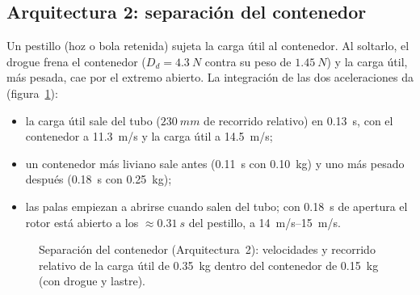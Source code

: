\subsection{Arquitectura 2: separación del contenedor}
Un pestillo (hoz o bola retenida) sujeta la carga útil al contenedor. Al soltarlo, el drogue
frena el contenedor ($D_d=\SI{4.3}{N}$ contra su peso de $\SI{1.45}{N}$) y la carga útil, más
pesada, cae por el extremo abierto. La integración de las dos aceleraciones da
(figura~\ref{fig:arq-sabot}):
\begin{itemize}
  \item la carga útil sale del tubo ($\SI{230}{mm}$ de recorrido relativo) en \SI{0.13}{s}, con el
        contenedor a \SI{11.3}{m/s} y la carga útil a \SI{14.5}{m/s};
  \item un contenedor más liviano sale antes (\SI{0.11}{s} con \SI{0.10}{kg}) y uno más
        pesado después (\SI{0.18}{s} con \SI{0.25}{kg});
  \item las palas empiezan a abrirse cuando salen del tubo; con \SI{0.18}{s} de apertura el
        rotor está abierto a los $\approx\SI{0.31}{s}$ del pestillo, a \SIrange{14}{15}{m/s}.
\end{itemize}

\begin{figure}[H]
\centering
{}
\caption{Separación del contenedor (Arquitectura~2): velocidades y recorrido relativo de la
carga útil de \SI{0.35}{kg} dentro del contenedor de \SI{0.15}{kg} (con drogue y lastre).}
\label{fig:arq-sabot}
\end{figure}

